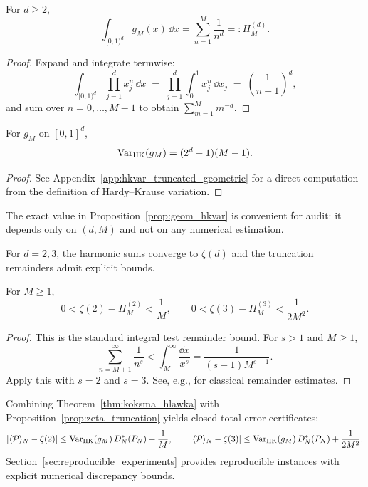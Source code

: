 \begin{lemma}
\label{lem:geom_period}
For $d\ge 2$,
\[
\int_{[0,1)^d} g_M(x)\,\dd x
 = \sum_{n=1}^M \frac{1}{n^d}
 =: H_M^{(d)}.
\]
\end{lemma}

\begin{proof}
Expand and integrate termwise:
\[
\int_{[0,1)^d}\prod_{j=1}^d x_j^n\,\dd x
\;=\;\prod_{j=1}^d \int_0^1 x_j^n\,\dd x_j
\;=\;\left(\frac{1}{n+1}\right)^d,
\]
and sum over $n=0,\dots,M-1$ to obtain $\sum_{m=1}^M m^{-d}$.
\end{proof}

\begin{proposition}
\label{prop:geom_hkvar}
For $g_M$ on $[0,1]^d$,
\[
\mathrm{Var}_{\mathrm{HK}}(g_M)=(2^d-1)(M-1).
\]
\end{proposition}

\begin{proof}
See Appendix~\ref{app:hkvar_truncated_geometric} for a direct computation from the definition of Hardy--Krause variation.
\end{proof}

\begin{remark}
The exact value in Proposition~\ref{prop:geom_hkvar} is convenient for audit: it depends only on $(d,M)$ and not on any numerical estimation.
\end{remark}

For $d=2,3$, the harmonic sums converge to $\zeta(d)$ and the truncation remainders admit explicit bounds.

\begin{proposition}
\label{prop:zeta_truncation}
For $M\ge 1$,
\[
0<\zeta(2)-H_M^{(2)}<\frac{1}{M},
\qquad
0<\zeta(3)-H_M^{(3)}<\frac{1}{2M^2}.
\]
\end{proposition}

\begin{proof}
This is the standard integral test remainder bound.
For $s>1$ and $M\ge 1$,
\[
\sum_{n=M+1}^\infty \frac{1}{n^s}
<
\int_M^\infty \frac{\dd x}{x^s}
=\frac{1}{(s-1)M^{s-1}}.
\]
Apply this with $s=2$ and $s=3$.
See, e.g., \cite[\S 12]{Apostol1976} for classical remainder estimates.
\end{proof}

Combining Theorem~\ref{thm:koksma_hlawka} with Proposition~\ref{prop:zeta_truncation} yields closed total-error certificates:
\[
\left|\langle \mathcal{P} \rangle_N-\zeta(2)\right|
\le \mathrm{Var}_{\mathrm{HK}}(g_M)\,D_N^\ast(P_N)+\frac{1}{M},
\qquad
\left|\langle \mathcal{P} \rangle_N-\zeta(3)\right|
\le \mathrm{Var}_{\mathrm{HK}}(g_M)\,D_N^\ast(P_N)+\frac{1}{2M^2}.
\]
Section~\ref{sec:reproducible_experiments} provides reproducible instances with explicit numerical discrepancy bounds.


